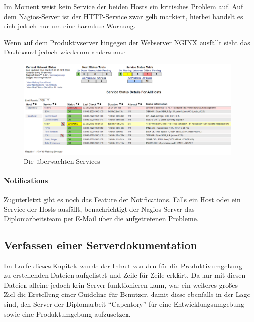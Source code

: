 Im Moment weist kein Service der beiden Hosts ein kritisches Problem
auf. Auf dem Nagios-Server ist der HTTP-Service zwar gelb markiert,
hierbei handelt es sich jedoch nur um eine harmlose Warnung.

Wenn auf dem Produktivserver hingegen der Webserver NGINX ausfällt sieht
das Dashboard jedoch wiederum anders aus:

\begin{figure}[ht]
\centering
\includegraphics{dednginx.png}
\caption{Die überwachten Services}
\end{figure}

\hypertarget{notifications}{%
\paragraph{Notifications}\label{notifications}}

Zuguterletzt gibt es noch das Feature der Notifications. Falls ein Host
oder ein Service der Hosts ausfällt, benachrichtigt der Nagios-Server
das Diplomarbeitsteam per E-Mail über die aufgetretenen Probleme.

\hypertarget{verfassen-einer-serverdokumentation}{%
\subsection{Verfassen einer
Serverdokumentation}\label{verfassen-einer-serverdokumentation}}

Im Laufe dieses Kapitels wurde der Inhalt von den für die
Produktivumgebung zu erstellenden Dateien aufgelistet und Zeile für
Zeile erklärt. Da nur mit diesen Dateien alleine jedoch kein Server
funktionieren kann, war ein weiteres großes Ziel die Erstellung einer
Guideline für Benutzer, damit diese ebenfalls in der Lage sind, den
Server der Diplomarbeit ``Capentory'' für eine Entwicklungsumgebung
sowie eine Produktumgebung aufzusetzen.
